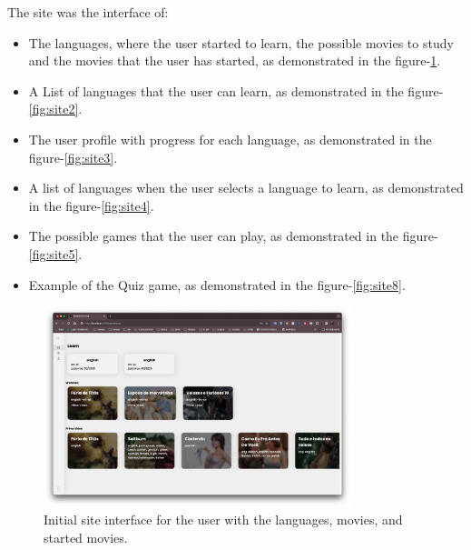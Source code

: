 \documentclass[12pt]{article}
\begin{document}
The site was the interface of:

\begin{itemize}
\item The languages, where the user started to learn, the possible movies to study and the movies that the user has started, as demonstrated in the figure-\ref{fig:site1}.
\item A List of languages that the user can learn, as demonstrated in the figure-\ref{fig:site2}.
\item The user profile with progress for each language, as demonstrated in the figure-\ref{fig:site3}.
\item A list of languages when the user selects a language to learn, as demonstrated in the figure-\ref{fig:site4}.
\item The possible games that the user can play, as demonstrated in the figure-\ref{fig:site5}.
\item Example of the Quiz game, as demonstrated in the figure-\ref{fig:site8}.
\end{itemize}






  \begin{figure}[h]
   \centering
   \caption{
   Initial site interface for the user with the languages, movies, and started movies.
    }
   \label{fig:site1}
   \includegraphics[width=0.8\textwidth]{assets/20.png}
  \end{figure}
\end{document}
